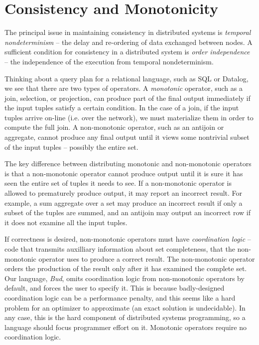 \section{Consistency and Monotonicity}

The principal issue in maintaining consistency in distributed systems is {\em
temporal nondeterminism} -- the delay and re-ordering of data exchanged between
nodes.  A sufficient condition for consistency in a distributed system is {\em
order independence} -- the independence of the execution from temporal
nondeterminism.


Thinking about a query plan for a relational language, such as SQL or Datalog,
we see that there are two types of operators.  A {\em monotonic} operator, such
as a join, selection, or projection, can produce part of the final output
immediately if the input tuples satisfy a certain condition.  In the case of a
join, if the input tuples arrive on-line (i.e. over the network), we must
materialize them in order to compute the full join.  A non-monotonic operator,
such as an antijoin or aggregate, cannot produce any final output until it
views some nontrivial subset of the input tuples -- possibly the entire set.

The key difference between distributing monotonic and non-monotonic operators
is that a non-monotonic operator cannot produce output until it is sure it has
seen the entire set of tuples it needs to see.  If a non-monotonic operator is
allowed to prematurely produce output, it may report an incorrect result.  For
example, a sum aggregate over a set may produce an incorrect result if only a
subset of the tuples are summed, and an antijoin may output an incorrect row if
it does not examine all the input tuples.

If correctness is desired, non-monotonic operators must have {\em coordination
logic} -- code that transmits auxilliary information about set completeness,
that the non-monotonic operator uses to produce a correct result.  The
non-monotonic operator orders the production of the result only after it has
examined the complete set.  Our language, {\em Bud}, omits coordination logic
from non-monotonic operators by default, and forces the user to specify it.
This is because badly-designed coordination logic can be a performance penalty,
and this seems like a hard problem for an optimizer to approximate (an exact
solution is undecidable).  In any case, this is the hard component of
distributed systems programming, so a language should focus programmer effort
on it.  Monotonic operators require no coordination logic.


